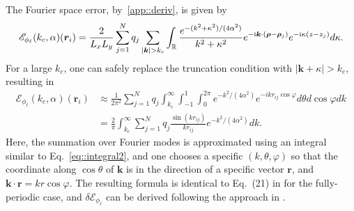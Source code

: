 The Fourier space error, by~\ref{app::deriv}, is given by
\begin{equation}
	\mathscr{E}_{\phi_{\ell}}(k_c,\alpha)(\bm{r}_{i})=\frac{2}{L_xL_y}\sum_{j=1}^{N}q_{j}\sum_{|\bm{k}|>k_c}\int_{\mathbb{R}}\frac{e^{-(k^2+\kappa^2)/(4\alpha^2)}}{k^2+\kappa^2}e^{-\m{i} \bm{k}\cdot(\bm{\rho}-\bm{\rho}_{j})}e^{-\m{i} \kappa(z-z_{j})}d\kappa.
\end{equation}
For a large $k_c$, one can safely replace the truncation condition with $|\bm{k}+\kappa|>k_c$, resulting in
\begin{equation}
	\begin{split}
		\mathscr{E}_{\phi_{\ell}}(k_c,\alpha)(\bm{r}_{i})&\approx \frac{1}{2\pi^2}\sum_{j=1}^{N}q_{j} \int_{k_c}^{\infty}\int_{-1}^{1}\int_{0}^{2\pi}e^{-k^2/(4\alpha^2)}e^{-i kr_{ij}\cos\varphi}d\theta d\cos\varphi dk\\
		&=\frac{2}{\pi}\int_{k_c}^{\infty}\sum_{j=1}^{N}q_{j}\frac{\sin(kr_{ij})}{kr_{ij}}e^{-k^2/(4\alpha^2)}dk.
	\end{split}
\end{equation}
Here, the summation over Fourier modes is approximated using an integral similar to Eq.~\eqref{eq::integral2}, and one chooses a specific $(k,\theta,\varphi)$ so that the coordinate along $\cos\theta$ of $\bm{k}$ is in the direction of a specific vector $\bm{r}$, and $\bm{k}\cdot\bm{r}=kr \cos\varphi$.
The resulting formula is identical to Eq.~(21) in \cite{kolafa1992cutoff} for the fully-periodic case, and $\delta \mathscr{E}_{\phi_{\ell}}$ can be derived following the approach in \cite{kolafa1992cutoff}. 



	
